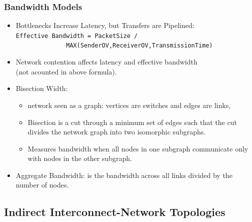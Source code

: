\documentclass{beamer}
\newcommand{\emp}[1]{\textcolor{DikuRed}{ #1}}
\begin{document}
\begin{frame}[fragile,t]
\frametitle{Bandwidth Models}

\begin{itemize}
    \item Bottlenecks Increase Latency, but Transfers are Pipelined:\\
          \emp{\tt Effective Bandwidth = PacketSize / }\\
                    \emp{\tt~~~~~~~~~~~~~~MAX(SenderOV,ReceiverOV,TransmissionTime)}\medskip

    \item Network contention affects latency and effective bandwidth\\
            (not acounted in above formula).\medskip

    \item \emp{Bisection Width:}
        \begin{itemize}
            \item network seen as a graph: vertices are switches and edges are links,
            \item Bisection is a cut through a minimum set of edges such that
                    the cut divides the network graph into two isomorphic subgraphs.
            \item \emp{Measures bandwidth when all nodes in one subgraph communicate 
                        only with nodes in the other subgraph.}
        \end  {itemize}\medskip

    \item \emp{Aggregate Bandwidth}: is the bandwidth across all links divided by
                the number of nodes. 
\end  {itemize}
\end{frame}

\subsection{Indirect Interconnect-Network Topologies}
\begin{frame}[fragile]
	\tableofcontents[currentsubsection]
\end{frame}
\end{document}
